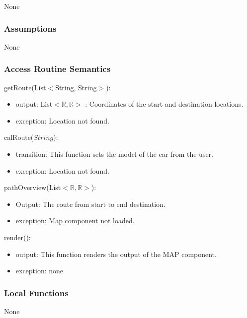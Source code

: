 \documentclass[12pt, titlepage]{article}
\begin{document}
None

\subsubsection{Assumptions}

None

\subsubsection{Access Routine Semantics}

\noindent getRoute(List$<$String, String$>$):
\begin{itemize}
\item output: List$<\mathbb{R},\mathbb{R}>$ : Coordinates of the start and destination locations.
\item exception: Location not found.
\end{itemize}

\noindent calRoute($String$):
\begin{itemize}
\item transition: This function sets the model of the car from the user.
\item exception: Location not found.
\end{itemize}

\noindent pathOverview(List$<\mathbb{R},\mathbb{R}>$):
\begin{itemize}
\item Output: The route from start to end destination.
\item exception: Map component not loaded.
\end{itemize}

\noindent render():
\begin{itemize}
\item output: This function renders the output of the MAP component.
\item exception: none
\end{itemize}

\subsubsection{Local Functions}

None

\newpage


\end{document}
